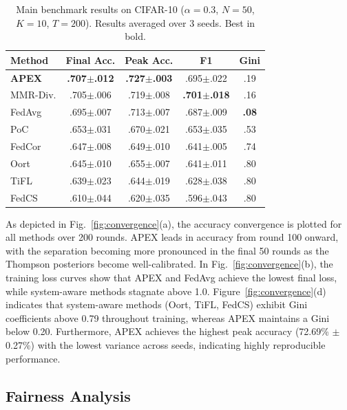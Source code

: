 \documentclass[journal]{IEEEtran}
\begin{document}
\begin{table}[t]
\centering
\caption{Main benchmark results on CIFAR-10 ($\alpha = 0.3$, $N = 50$, $K = 10$, $T = 200$). Results averaged over 3 seeds. Best in bold.}
\label{tab:main_results}
\footnotesize
\renewcommand{\arraystretch}{1.0}
\setlength{\tabcolsep}{2pt}
\begin{tabular}{lcccc}
\toprule
\textbf{Method} & \textbf{Final Acc.} & \textbf{Peak Acc.} & \textbf{F1} & \textbf{Gini} \\
\midrule
\textbf{APEX} & \textbf{.707$\pm$.012} & \textbf{.727$\pm$.003} & .695$\pm$.022 & .19 \\
MMR-Div. & .705$\pm$.006 & .719$\pm$.008 & \textbf{.701$\pm$.018} & .16 \\
FedAvg & .695$\pm$.007 & .713$\pm$.007 & .687$\pm$.009 & \textbf{.08} \\
PoC & .653$\pm$.031 & .670$\pm$.021 & .653$\pm$.035 & .53 \\
FedCor & .647$\pm$.008 & .649$\pm$.010 & .641$\pm$.005 & .74 \\
Oort & .645$\pm$.010 & .655$\pm$.007 & .641$\pm$.011 & .80 \\
TiFL & .639$\pm$.023 & .644$\pm$.019 & .628$\pm$.038 & .80 \\
FedCS & .610$\pm$.044 & .620$\pm$.035 & .596$\pm$.043 & .80 \\
\bottomrule
\end{tabular}
\end{table}

As depicted in Fig.~\ref{fig:convergence}(a), the accuracy convergence is plotted for all methods over 200 rounds. APEX leads in accuracy from round 100 onward, with the separation becoming more pronounced in the final 50 rounds as the Thompson posteriors become well-calibrated. In Fig.~\ref{fig:convergence}(b), the training loss curves show that APEX and FedAvg achieve the lowest final loss, while system-aware methods stagnate above 1.0. Figure~\ref{fig:convergence}(d) indicates that system-aware methods (Oort, TiFL, FedCS) exhibit Gini coefficients above 0.79 throughout training, whereas APEX maintains a Gini below 0.20. Furthermore, APEX achieves the highest peak accuracy (72.69\% $\pm$ 0.27\%) with the lowest variance across seeds, indicating highly reproducible performance.

\subsection{Fairness Analysis}
\end{document}
